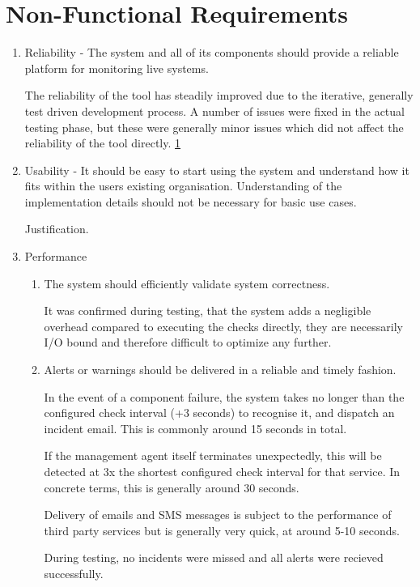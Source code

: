 \documentclass{cshonours}
\begin{document}
\section{Non-Functional Requirements}
\begin{enumerate}
  \item Reliability - The system and all of its components should provide a reliable platform for monitoring live systems.

    The reliability of the tool has steadily improved due to the iterative, generally test driven development process. A number of issues were fixed in the actual testing phase, but these were generally minor issues which did not affect the reliability of the tool directly. \ref{}

  \item Usability - It should be easy to start using the system and understand how it fits within the users existing organisation. Understanding of the implementation details should not be necessary for basic use cases.

    Justification.

  \item Performance
    \begin{enumerate}
      \item The system should efficiently validate system correctness.

        It was confirmed during testing, that the system adds a negligible overhead compared to executing the checks directly, they are necessarily I/O bound and therefore difficult to optimize any further.

      \item Alerts or warnings should be delivered in a reliable and timely fashion.

        In the event of a component failure, the system takes no longer than the configured check interval (+3 seconds) to recognise it, and dispatch an incident email. This is commonly around 15 seconds in total.

        If the management agent itself terminates unexpectedly, this will be detected at 3x the shortest configured check interval for that service. In concrete terms, this is generally around 30 seconds.
        
        Delivery of emails and SMS messages is subject to the performance of third party services but is generally very quick, at around 5-10 seconds.

        During testing, no incidents were missed and all alerts were recieved successfully.


\end{enumerate}
\end{enumerate}
\end{document}
